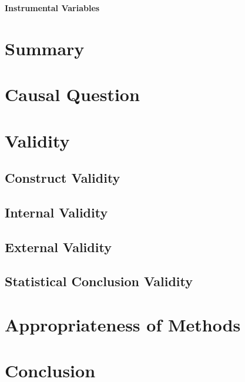 \begin{center}
    \textbf{Instrumental Variables}
\end{center}

\begin{hangparas}{0.5in}{1}
\end{hangparas}

\bigskip

\section{Summary}

\textcite{hanandita:2014}

\section{Causal Question}

\section{Validity}

\subsection{Construct Validity}

\subsection{Internal Validity}

\subsection{External Validity}

\subsection{Statistical Conclusion Validity}

\section{Appropriateness of Methods}

\section{Conclusion}
